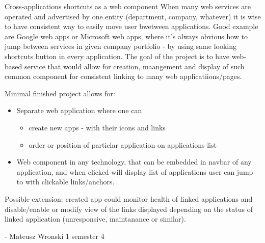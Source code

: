 \begin{project}
{Cross-applications shortcuts as a web component}
{When many web services are operated and advertised by one entity (department, company, whatever) it is wise to have consistent way to easily move user bwetween applications. Good example are Google web apps or Microsoft web apps, where it's always obvious how to jump between services in given company portfolio - by using same looking shortcuts button in every application. The goal of the project is to have web-based service that would allow for creation, maangement and display of such common component for consistent linking to many web applicatiions/pages.} 
{
Minimal finished project allows for:
\begin{itemize}
	\item Separate web application where one can 
		\begin{itemize}
			\item create new apps - with their icons and links
			\item order or position of particlar application on applications list
		\end{itemize}
	\item Web component in any technology, that can be embedded in navbar of any application, and when clicked will display list of applications user can jump to with clickable links/anchors.
\end{itemize}
Possible extension: created app could monitor health of linked applications and disable/enable or modify view of the links displayed depending on the status of linked application (unresponsive, maintanance or similar).
}
{-}
{Mateusz Wronski}
{1 semester}
{4}
\end{project}

